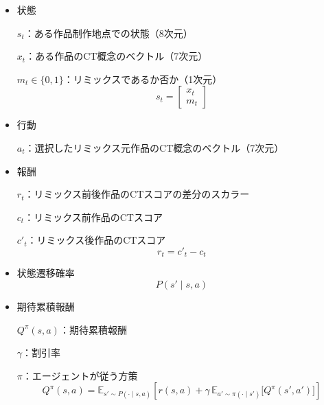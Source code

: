 \documentclass[submit,techrep,noauthor]{ipsj}
\begin{document}
\begin{itemize}
    \item 状態
        
        $s_t$：ある作品制作地点での状態（8次元）
    
        $x_t$：ある作品のCT概念のベクトル（7次元）
    
        $m_t\in\{0,1\}$：リミックスであるか否か（1次元）
        \begin{equation}
            s_t = 
            \begin{bmatrix}
               x_t \\
               m_t 
            \end{bmatrix}
        \end{equation}

    \item 行動

        $a_t$：選択したリミックス元作品のCT概念のベクトル（7次元）
    
      
    \item 報酬
    
        $r_t$：リミックス前後作品のCTスコアの差分のスカラー
        
        $c_t$：リミックス前作品のCTスコア
    
        $c'_t$：リミックス後作品のCTスコア
        \begin{equation}
            r_t = c'_t - c_t
        \end{equation}
    
        
    
        

    \item 状態遷移確率
        \begin{equation}
            P(s' \mid s, a)
        \end{equation}

    \item 期待累積報酬

        $Q^{\pi}(s, a)$：期待累積報酬
    
        $\gamma$：割引率
        
        $\pi$：エージェントが従う方策
        \begin{equation}
            Q^{\pi}(s, a) = \mathbb{E}_{s' \sim P(\cdot \mid s, a)} 
            \left[ r(s, a) + \gamma \, 
            \mathbb{E}_{a' \sim \pi(\cdot \mid s')} 
            \big[ Q^{\pi}(s', a') \big] \right]
        \end{equation}

\end{itemize}
\end{document}
